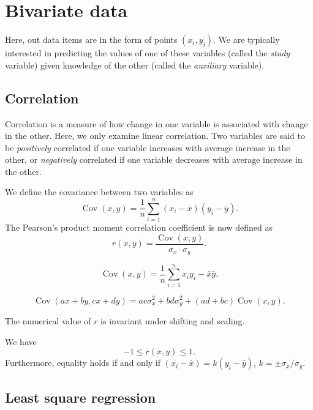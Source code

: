 \documentclass[11pt]{article}
\DeclareMathOperator{\cov}{Cov}
\theoremstyle{definition}
\theoremstyle{remark}
\numberwithin{equation}{section}
\begin{document}
    
    \section{Bivariate data}
    
    Here, out data items are in the form of points $(x_i, y_i)$. We are typically
    interested in predicting the values of one of these variables (called the
    \emph{study} variable) given knowledge of the other (called the \emph{auxiliary}
    variable).


    \subsection{Correlation}
    Correlation is a measure of how change in one variable is associated with change
    in the other. Here, we only examine linear correlation. Two variables are said to
    be \emph{positively} correlated if one variable increases with average increase
    in the other, or \emph{negatively} correlated if one variable decreases with
    average increase in the other.

    We define the covariance between two variables as \[
        \cov(x, y) = \frac{1}{n}\sum_{i = 1}^n (x_i - \bar{x})(y_i - \bar{y}).
    \] The Pearson's product moment correlation coefficient is now defined as \[
        r(x, y) = \frac{\cov(x, y)}{\sigma_x\cdot \sigma_y}.
    \]

    \begin{lemma}
        \[
            \cov(x, y) = \frac{1}{n}\sum_{i = 1}^n x_iy_i - \bar{x}\bar{y}.
        \] 
    \end{lemma}

    \begin{lemma}
        \[
            \cov(ax + by, cx + dy) = ac\sigma_x^2 + bd\sigma_y^2 + (ad + bc)\cov(x,
            y).
        \]
    \end{lemma}

    \begin{lemma}
        The numerical value of $r$ is invariant under shifting and scaling.
    \end{lemma}
    
    \begin{lemma}
        We have \[
            -1 \leq r(x, y) \leq 1.
        \] Furthermore, equality holds if and only if $(x_i - \bar{x}) = k(y_i -
        \bar{y})$, $k = \pm \sigma_x / \sigma_y$.
    \end{lemma}


    \subsection{Least square regression}
    
\end{document}
